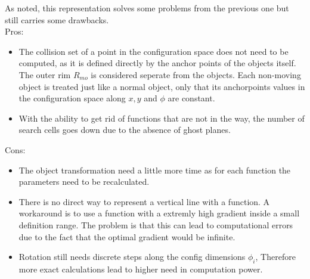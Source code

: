 As noted, this representation solves some problems from the previous one but still carries some drawbacks.\\
Pros:
\begin{itemize}
\item The collision set of a point in the configuration space does not need to be computed, as it is defined directly by the anchor points of the objects itself. The outer rim $R_{mo}$ is considered seperate from the objects. Each non-moving object is treated just like a normal object, only that its anchorpoints values in the configuration space along $x,y$ and $\phi$ are constant.
\item With the ability to get rid of functions that are not in the way, the number of search cells goes down due to the absence of ghost planes.
\end{itemize}
Cons:
\begin{itemize}
\item The object transformation need a little more time as for each function the parameters need to be recalculated.
\item There is no direct way to represent a vertical line with a function. A workaround is to use a function with a extremly high gradient inside a small definition range.
The problem is that this can lead to computational errors due to the fact that the optimal gradient would be infinite.
\item Rotation still needs discrete steps along the config dimensions $\phi_i$, Therefore more exact calculations lead to higher need in computation power.
\end{itemize}
